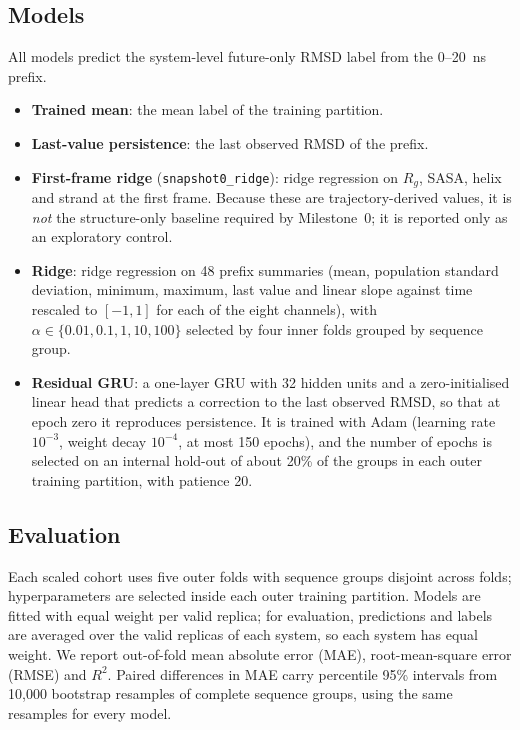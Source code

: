 \documentclass[11pt]{article}
\begin{document}
\subsection{Models}

All models predict the system-level future-only RMSD label from the 0--20~ns prefix.
\begin{itemize}
\item \textbf{Trained mean}: the mean label of the training partition.
\item \textbf{Last-value persistence}: the last observed RMSD of the prefix.
\item \textbf{First-frame ridge} (\texttt{snapshot0\_ridge}): ridge regression on $R_g$, SASA, helix and strand at the first frame. Because these are trajectory-derived values, it is \emph{not} the structure-only baseline required by Milestone~0; it is reported only as an exploratory control.
\item \textbf{Ridge}: ridge regression on 48 prefix summaries (mean, population standard deviation, minimum, maximum, last value and linear slope against time rescaled to $[-1,1]$ for each of the eight channels), with $\alpha\in\{0.01,0.1,1,10,100\}$ selected by four inner folds grouped by sequence group.
\item \textbf{Residual GRU}: a one-layer GRU with 32 hidden units and a zero-initialised linear head that predicts a correction to the last observed RMSD, so that at epoch zero it reproduces persistence. It is trained with Adam (learning rate $10^{-3}$, weight decay $10^{-4}$, at most 150 epochs), and the number of epochs is selected on an internal hold-out of about 20\% of the groups in each outer training partition, with patience 20.
\end{itemize}

\subsection{Evaluation}

Each scaled cohort uses five outer folds with sequence groups disjoint across folds; hyperparameters are selected inside each outer training partition. Models are fitted with equal weight per valid replica; for evaluation, predictions and labels are averaged over the valid replicas of each system, so each system has equal weight. We report out-of-fold mean absolute error (MAE), root-mean-square error (RMSE) and $R^2$. Paired differences in MAE carry percentile 95\% intervals from 10,000 bootstrap resamples of complete sequence groups, using the same resamples for every model.
\end{document}
